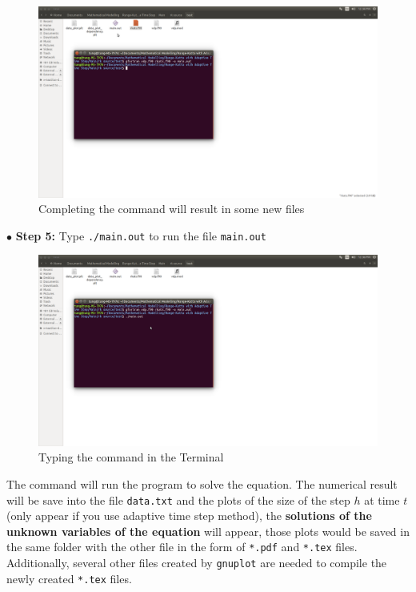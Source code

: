\documentclass[a4paper,oneside]{book}
\numberwithin{equation}{chapter}
\begin{document}
	\begin{figure}[H]
		\centering	\includegraphics[width=15cm]{fig6}
		\caption{Completing the command will result in some new files}
	\end{figure}
	\noindent$\bullet$ \textbf{Step 5:} Type \texttt{./main.out} to run the file \texttt{main.out}
	\begin{figure}[H]
		\centering	\includegraphics[width=15cm]{fig7}
		\caption{Typing the command in the Terminal}
	\end{figure}
	\noindent The command will run the program to solve the equation. The numerical result will be save into the file \texttt{data.txt} and the plots of the size of the step $h$ at time $t$ (only appear if you use adaptive time step method), the \textbf{solutions of the unknown variables of the equation} will appear, those plots would be saved in the same folder with the other file in the form of \texttt{*.pdf} and \texttt{*.tex} files. Additionally, several other files created by \texttt{gnuplot} are needed to compile the newly created \texttt{*.tex} files. 
\end{document}
